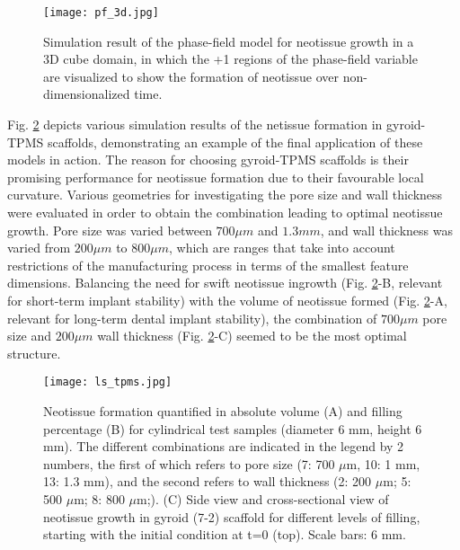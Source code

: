 \begin{figure}
\centering
\medskip
\texttt{[image: pf\_3d.jpg]}
\caption[Simulation result of the phase-field model for neotissue growth in a 3D cube domain]{Simulation result of the phase-field model for neotissue growth in a 3D cube domain, in which the +1 regions of the phase-field variable are visualized to show the formation of neotissue over non-dimensionalized time.}
\label{fig:tissue_pf_3d}
\end{figure}

Fig. \ref{fig:tissue_ls_tpms} depicts various simulation results of the netissue formation in gyroid-\gls{TPMS} scaffolds, demonstrating an example of the final application of these models in action. The reason for choosing gyroid-\gls{TPMS} scaffolds is their promising performance for neotissue formation due to their favourable local curvature. Various geometries for investigating the pore size and wall thickness were evaluated in order to obtain the combination leading to optimal neotissue growth. Pore size was varied between $700  \mu m$ and $1.3 mm $, and wall thickness was varied from $200 \mu m $ to $800 \mu m$, which are ranges that take into account restrictions of the manufacturing process in terms of the smallest feature dimensions. Balancing the need for swift neotissue ingrowth (Fig. \ref{fig:tissue_ls_tpms}-B, relevant for short-term implant stability) with the volume of neotissue formed (Fig. \ref{fig:tissue_ls_tpms}-A, relevant for long-term dental implant stability), the combination of $700 \mu m$ pore size and $200 \mu m $ wall thickness (Fig. \ref{fig:tissue_ls_tpms}-C) seemed to be the most optimal structure.

\begin{figure}
\centering
\medskip
\texttt{[image: ls\_tpms.jpg]}
\caption[Simulation results of the level-set model for neotissue formation on TPMS scaffolds]{Neotissue formation quantified in absolute volume (A) and filling percentage (B) for cylindrical test samples (diameter 6 mm, height 6 mm). The different combinations are indicated in the legend by 2 numbers, the first of which refers to pore size (7: 700 $\mu$m, 10: 1 mm, 13: 1.3 mm), and the second refers to wall thickness (2: 200 $\mu$m; 5: 500 $\mu$m; 8: 800 $\mu$m;). (C) Side view and cross-sectional view of neotissue growth in gyroid (7-2) scaffold for different levels of filling, starting with the initial condition at t=0 (top). Scale bars: 6 mm.}
\label{fig:tissue_ls_tpms}
\end{figure}

